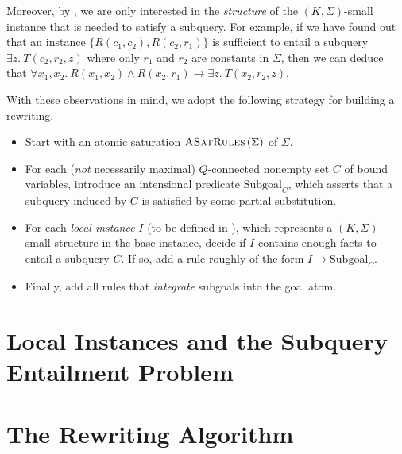\documentclass[12pt]{report}
\theoremstyle{plain}
\theoremstyle{definition}
\newcommand{\ASatRules}[1]{\ensuremath{\normalfont{\textsc{ASatRules}} \left( #1 \right)}}
\begin{document}
Moreover, by , we are only interested in the \emph{structure} of the $(K, \Sigma)$-small instance that is needed to satisfy a subquery. For example, if we have found out that an instance $\{R(c_1, c_2), R(c_2, r_1)\}$ is sufficient to entail a subquery $\exists z.\ T(c_2, r_2, z)$ where only $r_1$ and $r_2$ are constants in $\Sigma$, then we can deduce that $\forall x_1, x_2.\ R(x_1, x_2) \wedge R(x_2, r_1) \rightarrow \exists z.\ T(x_2, r_2, z)$.

With these observations in mind, we adopt the following strategy for building a rewriting.

\begin{itemize}
  \item Start with an atomic saturation $\ASatRules{\Sigma}$ of $\Sigma$.
  \item For each (\emph{not} necessarily maximal) $Q$-connected nonempty set $C$ of bound variables, introduce an intensional predicate $\mathrm{Subgoal}_C$, which asserts that a subquery induced by $C$ is satisfied by some partial substitution.
  \item For each \emph{local instance} $I$ (to be defined in ), which represents a $(K, \Sigma)$-small structure in the base instance, decide if $I$ contains enough facts to entail a subquery $C$. If so, add a rule roughly of the form $I \rightarrow \mathrm{Subgoal}_C$.
  \item Finally, add all rules that \emph{integrate} subgoals into the goal atom.
\end{itemize}

\section{Local Instances and the Subquery Entailment Problem}
\label{local-instances-and-the-subquery-entailment-problem}


\section{The Rewriting Algorithm}

\end{document}
